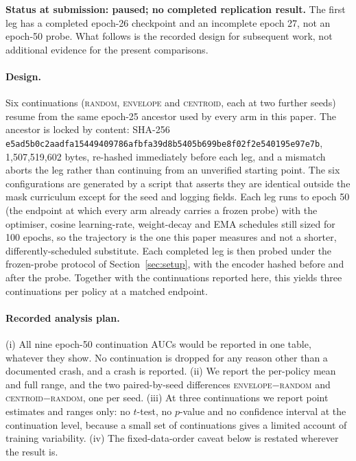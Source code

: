 \documentclass{article}
\newcommand{\ArmBest}{\textsc{centroid}}
\begin{document}
\textbf{Status at submission: paused; no completed replication result.}
The first leg has a completed epoch-26 checkpoint and an incomplete epoch 27,
not an epoch-50 probe. What follows is the recorded design for subsequent work,
not additional evidence for the present comparisons.

\paragraph{Design.} Six continuations (\textsc{random}, \textsc{envelope} and
\ArmBest{}, each at two further seeds) resume from the same epoch-25 ancestor
used by every arm in this paper. The ancestor is locked by content: SHA-256
\texttt{e5ad5b0c2aadfa15449409786afbfa39d8b5405b699be8f02f2e540195e97e7b},
1{,}507{,}519{,}602 bytes, re-hashed immediately before each leg, and a mismatch
aborts the leg rather than continuing from an unverified starting point. The six
configurations are generated by a script that asserts they are identical outside
the mask curriculum except for the seed and logging fields. Each leg runs to
epoch 50 (the endpoint at which every arm already carries a frozen probe)
with the optimiser, cosine learning-rate, weight-decay and EMA schedules still
sized for 100 epochs, so the trajectory is the one this paper measures and not a
shorter, differently-scheduled substitute. Each completed leg is then probed
under the frozen-probe protocol of Section~\ref{sec:setup}, with the encoder
hashed before and after the probe. Together with the continuations reported
here, this yields three continuations per policy at a matched endpoint.

\paragraph{Recorded analysis plan.} (i) All nine epoch-50 continuation AUCs would be
reported in one table, whatever they show. No continuation is dropped for any
reason other than a documented crash, and a crash is reported. (ii) We report
the per-policy mean and full range, and the two paired-by-seed differences
\textsc{envelope}$-$\textsc{random} and \ArmBest{}$-$\textsc{random}, one per
seed. (iii) At three continuations we report point estimates and ranges only:
no $t$-test, no $p$-value and no confidence interval at the continuation level,
because a small set of continuations gives a limited account of training
variability. (iv) The
fixed-data-order caveat below is restated wherever the result is.
\end{document}
